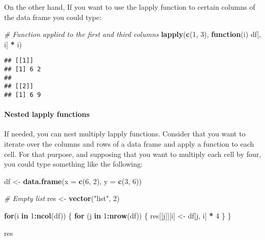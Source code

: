 \documentclass[
]{article}
\newenvironment{Shaded}{\begin{snugshade}}{\end{snugshade}}
\newcommand{\AttributeTok}[1]{\textcolor[rgb]{0.13,0.29,0.53}{#1}}
\newcommand{\CommentTok}[1]{\textcolor[rgb]{0.56,0.35,0.01}{\textit{#1}}}
\newcommand{\ControlFlowTok}[1]{\textcolor[rgb]{0.13,0.29,0.53}{\textbf{#1}}}
\newcommand{\DecValTok}[1]{\textcolor[rgb]{0.00,0.00,0.81}{#1}}
\newcommand{\FunctionTok}[1]{\textcolor[rgb]{0.13,0.29,0.53}{\textbf{#1}}}
\newcommand{\NormalTok}[1]{#1}
\newcommand{\OtherTok}[1]{\textcolor[rgb]{0.56,0.35,0.01}{#1}}
\newcommand{\SpecialCharTok}[1]{\textcolor[rgb]{0.81,0.36,0.00}{\textbf{#1}}}
\newcommand{\StringTok}[1]{\textcolor[rgb]{0.31,0.60,0.02}{#1}}
\begin{document}
On the other hand, If you want to use the lapply function to certain
columns of the data frame you could type:

\begin{Shaded}
\begin{Highlighting}[]
\CommentTok{\# Function applied to the first and third columns}
\FunctionTok{lapply}\NormalTok{(}\FunctionTok{c}\NormalTok{(}\DecValTok{1}\NormalTok{, }\DecValTok{3}\NormalTok{), }\ControlFlowTok{function}\NormalTok{(i) df[, i] }\SpecialCharTok{*}\NormalTok{ i)}
\end{Highlighting}
\end{Shaded}

\begin{verbatim}
## [[1]]
## [1] 6 2
## 
## [[2]]
## [1] 6 9
\end{verbatim}

\hypertarget{nested-lapply-functions}{%
\paragraph{Nested lapply functions}\label{nested-lapply-functions}}

If needed, you can nest multiply lapply functions. Consider that you
want to iterate over the columns and rows of a data frame and apply a
function to each cell. For that purpose, and supposing that you want to
multiply each cell by four, you could type something like the following:

\begin{Shaded}
\begin{Highlighting}[]
\NormalTok{df }\OtherTok{\textless{}{-}} \FunctionTok{data.frame}\NormalTok{(}\AttributeTok{x =} \FunctionTok{c}\NormalTok{(}\DecValTok{6}\NormalTok{, }\DecValTok{2}\NormalTok{), }\AttributeTok{y =} \FunctionTok{c}\NormalTok{(}\DecValTok{3}\NormalTok{, }\DecValTok{6}\NormalTok{))}

\CommentTok{\# Empty list}
\NormalTok{res }\OtherTok{\textless{}{-}} \FunctionTok{vector}\NormalTok{(}\StringTok{"list"}\NormalTok{, }\DecValTok{2}\NormalTok{)}

\ControlFlowTok{for}\NormalTok{(i }\ControlFlowTok{in} \DecValTok{1}\SpecialCharTok{:}\FunctionTok{ncol}\NormalTok{(df)) \{}
    \ControlFlowTok{for}\NormalTok{ (j }\ControlFlowTok{in} \DecValTok{1}\SpecialCharTok{:}\FunctionTok{nrow}\NormalTok{(df)) \{}
\NormalTok{        res[[j]][i] }\OtherTok{\textless{}{-}}\NormalTok{ df[j, i] }\SpecialCharTok{*} \DecValTok{4}
\NormalTok{    \}}
\NormalTok{\}}

\NormalTok{res}
\end{Highlighting}
\end{Shaded}
\end{document}
